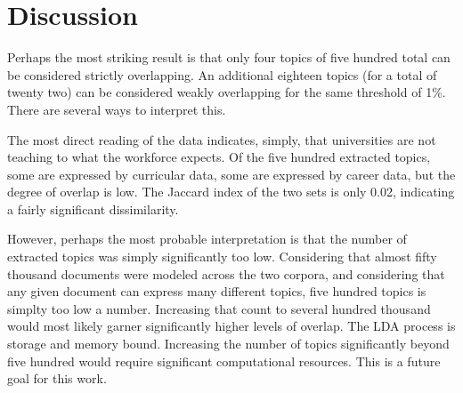 \section{Discussion}

Perhaps the most striking result is that only four topics of five hundred total can be considered strictly overlapping.
An additional eighteen topics (for a total of twenty two) can be considered weakly overlapping for the same threshold of 1\%.
There are several ways to interpret this.

The most direct reading of the data indicates, simply, that universities are not teaching to what the workforce expects.
Of the five hundred extracted topics, some are expressed by curricular data, some are expressed by career data, but the degree of overlap is low.
The Jaccard index of the two sets is only 0.02, indicating a fairly significant dissimilarity.

However, perhaps the most probable interpretation is that the number of extracted topics was simply significantly too low.
Considering that almost fifty thousand documents were modeled across the two corpora, and considering that any given document can express many different topics, five hundred topics is simplty too low a number.
Increasing that count to several hundred thousand would most likely garner significantly higher levels of overlap.
The LDA process is storage and memory bound.
Increasing the number of topics significantly beyond five hundred would require significant computational resources.
This is a future goal for this work.
